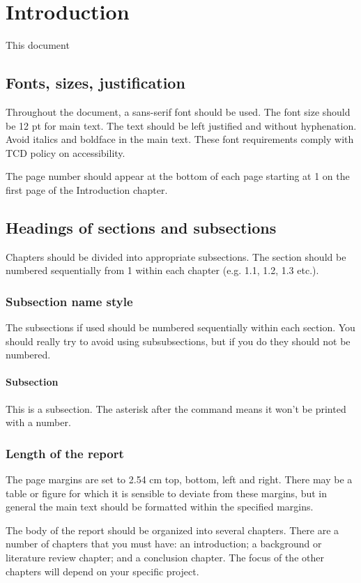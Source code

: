 \chapter{Introduction}
This document 

\section{Fonts, sizes, justification}

Throughout the document, a sans-serif font should be used. The font size should be 12 pt for main text. The text should be left justified and without hyphenation. Avoid italics and boldface in the main text. These font requirements comply with TCD policy on accessibility.

The page number should appear at the bottom of each page starting at 1 on the first page of the Introduction chapter. 

\section{Headings of sections and subsections}
Chapters should be divided into appropriate subsections. The section should be numbered sequentially from 1 within each chapter (e.g. 1.1, 1.2, 1.3 etc.).

\subsection{Subsection name style}
The subsections if used should be numbered sequentially within each section. You should really try to avoid using subsubsections, but if you do they should not be numbered.

\subsubsection*{Subsection}
This is a subsection. The asterisk after the command means it won't be printed with a number.

\subsection{Length of the report}
The page margins are set to 2.54 cm top, bottom, left and right. There may be a table or figure for which it is sensible to deviate from these margins, but in general the main text should be formatted within the specified margins.

The body of the report should be organized into several chapters. There are a number of chapters that you must have: an introduction; a background or literature review chapter; and a conclusion chapter. The focus of the other chapters will depend on your specific project.

